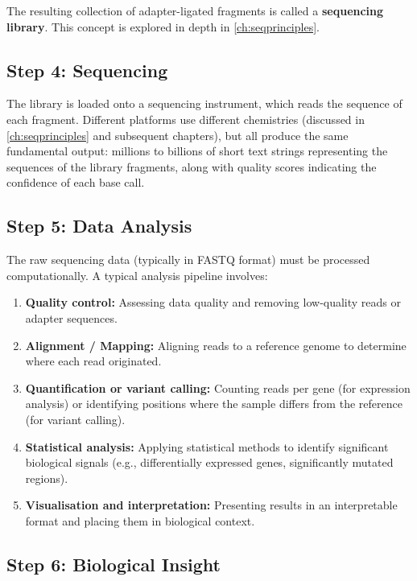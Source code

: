 The resulting collection of adapter-ligated fragments is called a \textbf{sequencing library}. This concept is explored in depth in \cref{ch:seqprinciples}.

\subsection{Step 4: Sequencing}
\label{subsec:intro:sequencing}

The library is loaded onto a sequencing instrument, which reads the sequence of each fragment. Different platforms use different chemistries (discussed in \cref{ch:seqprinciples} and subsequent chapters), but all produce the same fundamental output: millions to billions of short text strings representing the sequences of the library fragments, along with quality scores indicating the confidence of each base call.

\subsection{Step 5: Data Analysis}
\label{subsec:intro:analysis}

The raw sequencing data (typically in \acrshort{FASTQ} format) must be processed computationally. A typical analysis pipeline involves:

\begin{enumerate}[itemsep=2pt]
  \item \textbf{Quality control:} Assessing data quality and removing low-quality reads or adapter sequences.
  \item \textbf{Alignment / Mapping:} Aligning reads to a reference genome to determine where each read originated.
  \item \textbf{Quantification or variant calling:} Counting reads per gene (for expression analysis) or identifying positions where the sample differs from the reference (for variant calling).
  \item \textbf{Statistical analysis:} Applying statistical methods to identify significant biological signals (e.g., differentially expressed genes, significantly mutated regions).
  \item \textbf{Visualisation and interpretation:} Presenting results in an interpretable format and placing them in biological context.
\end{enumerate}

\subsection{Step 6: Biological Insight}
\label{subsec:intro:insight}

